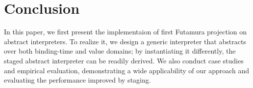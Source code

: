\section{Conclusion}

In this paper, we first present the implementaion of first Futamura projection
on abstract interpreters. To realize it, we design a generic interpreter that
abstracts over both binding-time and value domains; by instantiating it
differently, the staged abstract interpreter can be readily derived. We also
conduct case studies and empirical evaluation, demonstrating a wide
applicability of our approach and evaluating the performance improved by staging.
